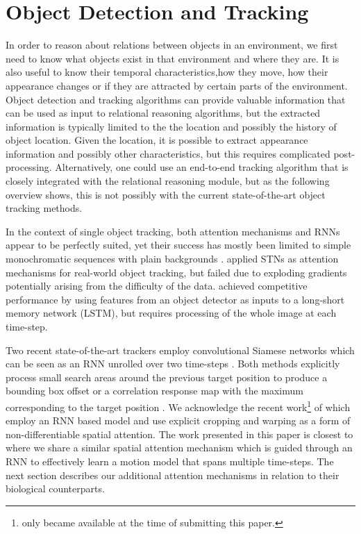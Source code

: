 \section{Object Detection and Tracking}
\label{sec:object_det_track}

	In order to reason about relations between objects in an environment, we first need to know what objects exist in that environment and where they are.
	It is also useful to know their temporal characteristics,\ie how they move, how their appearance changes or if they are attracted by certain parts of the environment.
	Object detection and tracking algorithms can provide valuable information that can be used as input to relational reasoning algorithms, but the extracted information is typically limited to the the location and possibly the history of object location.
	Given the location, it is possible to extract appearance information and possibly other characteristics, but this requires complicated post-processing.
	Alternatively, one could use an end-to-end tracking algorithm that is closely integrated with the relational reasoning module, but as the following overview shows, this is not possibly with the current state-of-the-art object tracking methods.
	
	In the context of single object tracking, both attention mechanisms and RNNs appear to be perfectly suited, yet their success has mostly been limited to simple monochromatic sequences with plain backgrounds \cite{Kahou2015ratm}. \citet{Cheung2016gtc} applied STNs \cite{Jaderberg2015} as attention mechanisms for real-world object tracking, but failed due to exploding gradients potentially arising from the difficulty of the data.
	\citet{Ning2016} achieved competitive performance by using features from an object detector as inputs to a long-short memory network (LSTM), but requires processing of the whole image at each time-step. 
	
	Two recent state-of-the-art trackers employ convolutional Siamese networks which can be seen as an RNN unrolled over two time-steps \cite{Held2016goturn, Valmadre2017}. Both methods explicitly process small search areas around the previous target position to produce a bounding box offset \cite{Held2016goturn} or a correlation response map with the maximum corresponding to the target position \cite{Valmadre2017}. 
	We acknowledge the recent work\footnote{\cite{Gordon2018re3} only became available at the time of submitting this paper.} of \citet{Gordon2018re3} which employ an RNN based model and use explicit cropping and warping as a form of non-differentiable spatial attention.
	The work presented in this paper is closest to \cite{Kahou2015ratm} where we share a similar spatial attention mechanism which is guided through an RNN to effectively learn a motion model that spans multiple time-steps. The next section describes our additional attention mechanisms in relation to their biological counterparts.
	
